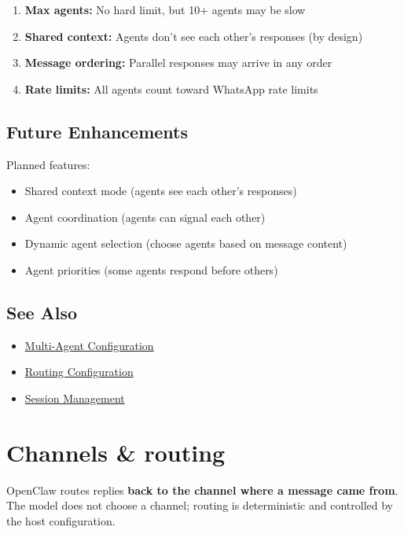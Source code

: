 \begin{enumerate}
  \item \textbf{Max agents:} No hard limit, but 10+ agents may be slow
  \item \textbf{Shared context:} Agents don't see each other's responses (by design)
  \item \textbf{Message ordering:} Parallel responses may arrive in any order
  \item \textbf{Rate limits:} All agents count toward WhatsApp rate limits
\end{enumerate}


\subsection{Future Enhancements}


Planned features:

\begin{itemize}
  \item [ ] Shared context mode (agents see each other's responses)
  \item [ ] Agent coordination (agents can signal each other)
  \item [ ] Dynamic agent selection (choose agents based on message content)
  \item [ ] Agent priorities (some agents respond before others)
\end{itemize}


\subsection{See Also}


\begin{itemize}
  \item \href{/tools/multi-agent-sandbox-tools}{Multi-Agent Configuration}
  \item \href{/channels/channel-routing}{Routing Configuration}
  \item \href{/concepts/session}{Session Management}
\end{itemize}



\clearpage

\section{Channels \& routing}


OpenClaw routes replies \textbf{back to the channel where a message came from}. The
model does not choose a channel; routing is deterministic and controlled by the
host configuration.

